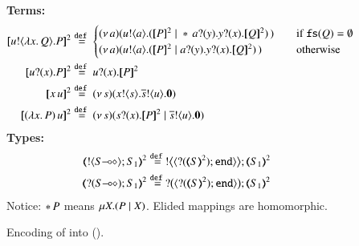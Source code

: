 
\begin{figure}[t]
{\bf Terms:} 
\begin{align*}
	\pmap{\bout{u}{\abs{x}{Q}} P}{2} & \defeq  
	\begin{cases}
		\newsp{a}{\bout{u}{a} (\pmap{P}{2} \Par \repl{} \binp{a}{y} \binp{y}{x} \pmap{Q}{2})\,}\quad
		& \text{if $\fs{Q} = \emptyset$}
		\\
		\newsp{a}{\bout{u}{a} (\pmap{P}{2} \Par \binp{a}{y} \binp{y}{x} \pmap{Q}{2})\,}\quad
		& \text{otherwise} %
	\end{cases}
	\\
	\pmap{\binp{u}{x} P}{2} &\defeq  \binp{u}{x} \pmap{P}{2}
	 \\
	\pmap{\appl{x}{u}}{2} &\defeq \newsp{s}{\bout{x}{s} \bout{\dual{s}}{u} \inact}
	\\
	\pmap{\appl{(\abs{x}{P})}{u}}{2} & \defeq  %
	\newsp{s}{\binp{s}{x} \pmap{P}{2} \Par \bout{\dual{s}}{u} \inact}
\end{align*}
{\bf Types:}
\begin{align*}
		\tmap{\btout{\lhot{S}}S_1}{2} & \defeq \bbtout{\chtype{\btinp{\tmap{S}{2}}\tinact}}\tmap{S_1}{2}
		\\
		\tmap{\btinp{\lhot{S}}S_1}{2} & \defeq \bbtinp{\chtype{\btinp{\tmap{S}{2}}\tinact}}\tmap{S_1}{2}
\end{align*}
{Notice: $\ast\,{} P$ means $\mu X. (P \;|\; X)$. Elided mappings are homomorphic.}
\caption{Encoding of \HOp into \sessp (). \label{f:enc:ho_to_sessp}}
\end{figure}

